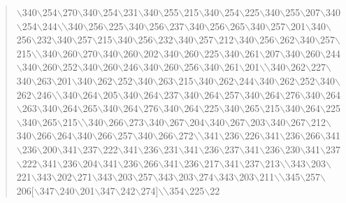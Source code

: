 \documentclass[11pt]{article}
\begin{document}
\begin{quote}
$\backslash$340$\backslash$254$\backslash$270$\backslash$340$\backslash$254$\backslash$231$\backslash$340$\backslash$255$\backslash$215$\backslash$340$\backslash$254$\backslash$225$\backslash$340$\backslash$255$\backslash$207$\backslash$340$\backslash$254$\backslash$244$\backslash$\|$\backslash$340$\backslash$256$\backslash$225$\backslash$340$\backslash$256$\backslash$237$\backslash$340$\backslash$256$\backslash$265$\backslash$340$\backslash$257$\backslash$201$\backslash$340$\backslash$256$\backslash$232$\backslash$340$\backslash$257$\backslash$215$\backslash$340$\backslash$256$\backslash$232$\backslash$340$\backslash$257$\backslash$212$\backslash$340$\backslash$256$\backslash$262$\backslash$340$\backslash$257$\backslash$215$\backslash$\|$\backslash$340$\backslash$260$\backslash$270$\backslash$340$\backslash$260$\backslash$202$\backslash$340$\backslash$260$\backslash$225$\backslash$340$\backslash$261$\backslash$207$\backslash$340$\backslash$260$\backslash$244$\backslash$340$\backslash$260$\backslash$252$\backslash$340$\backslash$260$\backslash$246$\backslash$340$\backslash$260$\backslash$256$\backslash$340$\backslash$261$\backslash$201$\backslash$\|$\backslash$340$\backslash$262$\backslash$227$\backslash$340$\backslash$263$\backslash$201$\backslash$340$\backslash$262$\backslash$252$\backslash$340$\backslash$263$\backslash$215$\backslash$340$\backslash$262$\backslash$244$\backslash$340$\backslash$262$\backslash$252$\backslash$340$\backslash$262$\backslash$246$\backslash$\|$\backslash$340$\backslash$264$\backslash$205$\backslash$340$\backslash$264$\backslash$237$\backslash$340$\backslash$264$\backslash$257$\backslash$340$\backslash$264$\backslash$276$\backslash$340$\backslash$264$\backslash$263$\backslash$340$\backslash$264$\backslash$265$\backslash$340$\backslash$264$\backslash$276$\backslash$340$\backslash$264$\backslash$225$\backslash$340$\backslash$265$\backslash$215$\backslash$340$\backslash$264$\backslash$225$\backslash$340$\backslash$265$\backslash$215$\backslash$\|$\backslash$340$\backslash$266$\backslash$273$\backslash$340$\backslash$267$\backslash$204$\backslash$340$\backslash$267$\backslash$203$\backslash$340$\backslash$267$\backslash$212$\backslash$340$\backslash$266$\backslash$264$\backslash$340$\backslash$266$\backslash$257$\backslash$340$\backslash$266$\backslash$272$\backslash$\|$\backslash$341$\backslash$236$\backslash$226$\backslash$341$\backslash$236$\backslash$266$\backslash$341$\backslash$236$\backslash$200$\backslash$341$\backslash$237$\backslash$222$\backslash$341$\backslash$236$\backslash$231$\backslash$341$\backslash$236$\backslash$237$\backslash$341$\backslash$236$\backslash$230$\backslash$341$\backslash$237$\backslash$222$\backslash$341$\backslash$236$\backslash$204$\backslash$341$\backslash$236$\backslash$266$\backslash$341$\backslash$236$\backslash$217$\backslash$341$\backslash$237$\backslash$213$\backslash$\|$\backslash$343$\backslash$203$\backslash$221$\backslash$343$\backslash$202$\backslash$271$\backslash$343$\backslash$203$\backslash$257$\backslash$343$\backslash$203$\backslash$274$\backslash$343$\backslash$203$\backslash$211$\backslash$\|$\backslash$345$\backslash$257$\backslash$206[$\backslash$347$\backslash$240$\backslash$201$\backslash$347$\backslash$242$\backslash$274]$\backslash$\|$\backslash$354$\backslash$225$\backslash$22
\end{quote}
\end{document}
